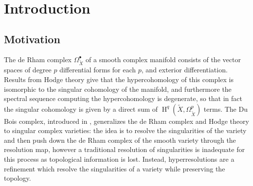 \documentclass[proquest]{uwthesis}[2014/11/13]
\theoremstyle{definition}
\DeclareMathOperator{\Ho}{H}
\begin{document}
\prelimpages
{}

\copyrightpage
\titlepage

\tableofcontents

\textpages

\chapter{Introduction}
\section{Motivation}
The de Rham complex $\Omega_{\tilde{X}}^\bullet$ of a smooth complex manifold consists of the vector spaces of degree $p$ differential forms for each $p$, and exterior differentiation. Results from Hodge theory give that the hypercohomology of this complex is isomorphic to the singular cohomology of the manifold, and furthermore the spectral sequence computing the hypercohomology is degenerate, so that in fact the singular cohomology is given by a direct sum of $\Ho^q(\tilde{X}, \Omega_{\tilde{X}}^p)$ terms.
The Du Bois complex, introduced in \cite{Bois1981}, generalizes the de Rham complex and Hodge theory to singular complex varieties: the idea is to resolve the singularities of the variety and then push down the de Rham complex of the smooth variety through the resolution map, however a traditional resolution of singularities is inadequate for this process as topological information is lost.
Instead, hyperresolutions are a refinement which resolve the singularities of a variety while preserving the topology.
\end{document}
